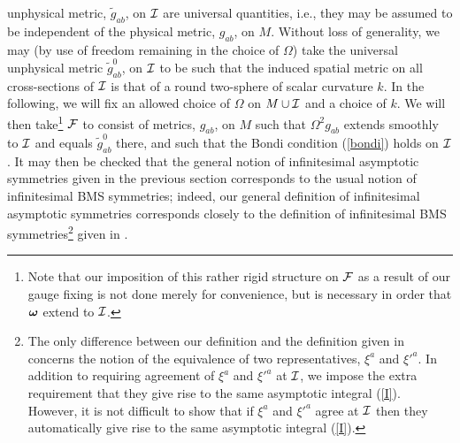 unphysical metric, $\tilde{g}_{ab}$, on ${\cal I}$ are universal
quantities, i.e., they may be assumed to be independent of the
physical metric, $g_{ab}$, on $M$. Without loss of generality, we may
(by use of freedom remaining in the choice of $\Omega$) take the
universal unphysical metric $\tilde{g}^0_{ab}$, on ${\cal I}$ to be
such that the induced spatial metric on all cross-sections of ${\cal
I}$ is that of a round two-sphere of scalar curvature $k$.  In the
following, we will fix an allowed choice of $\Omega$ on $M \cup {\cal
I}$ and a choice of $k$. We will then take\footnote{Note that our
imposition of this rather rigid structure on $\cal F$ as a result of
our gauge fixing is not done merely for convenience, but is necessary
in order that ${\mbox{\boldmath $\omega$}}$ extend to $\cal I$.}
${\cal F}$ to consist of metrics, $g_{ab}$, on $M$ such that $\Omega^2
g_{ab}$ extends smoothly to ${\cal I}$ and equals $\tilde{g}^0_{ab}$
there, and such that the Bondi condition (\ref{bondi}) holds on ${\cal
I}$. It may then be checked that the general notion of infinitesimal
asymptotic symmetries given in the previous section corresponds to the
usual notion of infinitesimal BMS symmetries; indeed, our general
definition of infinitesimal asymptotic symmetries corresponds closely
to the definition of infinitesimal BMS symmetries\footnote{The only
difference between our definition and the definition given in
\cite{gw} concerns the notion of the equivalence of two
representatives, $\xi^a$ and ${\xi'}^a$. In addition to requiring
agreement of $\xi^a$ and ${\xi'}^a$ at $\cal I$, we impose the extra
requirement that they give rise to the same asymptotic integral
(\ref{I}). However, it is not difficult to show that if $\xi^a$ and
${\xi'}^a$ agree at $\cal I$ then they automatically give rise to the
same asymptotic integral (\ref{I}).} given in \cite{gw}.

